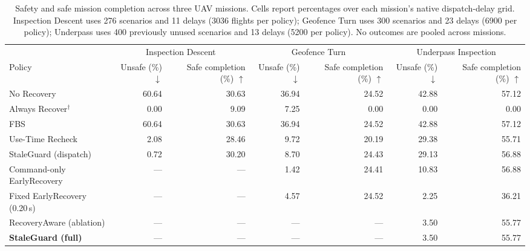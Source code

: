 \begin{table}[t]
\centering
\caption{Safety and safe mission completion across three UAV missions.
Cells report percentages over each mission's native dispatch-delay grid.
Inspection Descent uses 276 scenarios and 11 delays (3036 flights per
policy); Geofence Turn uses 300 scenarios and 23 delays (6900 per policy);
Underpass uses 400 previously unused scenarios and 13 delays (5200 per
policy). No outcomes are pooled across missions.}
\label{tab:three_mission_policy_outcomes}
\begingroup
\small
\setlength{\tabcolsep}{5pt}
\renewcommand{\arraystretch}{1.15}
\begin{tabular}{@{}lrrrrrr@{}}
\toprule
& \multicolumn{2}{c}{Inspection Descent}
& \multicolumn{2}{c}{Geofence Turn}
& \multicolumn{2}{c}{Underpass Inspection} \\
\cmidrule(lr){2-3}\cmidrule(lr){4-5}\cmidrule(lr){6-7}
Policy &
\shortstack{Unsafe\\(\%) $\downarrow$} &
\shortstack{Safe completion\\(\%) $\uparrow$} &
\shortstack{Unsafe\\(\%) $\downarrow$} &
\shortstack{Safe completion\\(\%) $\uparrow$} &
\shortstack{Unsafe\\(\%) $\downarrow$} &
\shortstack{Safe completion\\(\%) $\uparrow$} \\
\midrule
No Recovery & 60.64 & 30.63 & 36.94 & 24.52 & 42.88 & 57.12 \\
Always Recover$^{\dagger}$ & 0.00 & 9.09 & 7.25 & 0.00 & 0.00 & 0.00 \\
FBS & 60.64 & 30.63 & 36.94 & 24.52 & 42.88 & 57.12 \\
Use-Time Recheck & 2.08 & 28.46 & 9.72 & 20.19 & 29.38 & 55.71 \\
StaleGuard (dispatch) & 0.72 & 30.20 & 8.70 & 24.43 & 29.13 & 56.88 \\
Command-only EarlyRecovery & --- & --- & 1.42 & 24.41 & 10.83 & 56.88 \\
Fixed EarlyRecovery (0.20\,s) & --- & --- & 4.57 & 24.52 & 2.25 & 36.21 \\
\midrule
RecoveryAware (ablation) & --- & --- & --- & --- & 3.50 & 55.77 \\
\textbf{StaleGuard (full)} & --- & --- & --- & --- & 3.50 & 55.77 \\
\bottomrule
\end{tabular}


\end{table}
